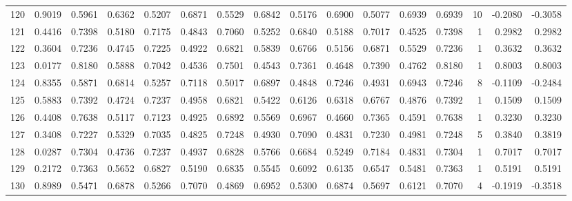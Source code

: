 \begin{tabular}{lrrrrrrrrrrrrrrr}
120 &      0.9019 &  0.5961 &  0.6362 &  0.5207 &  0.6871 &  0.5529 &  0.6842 &  0.5176 &  0.6900 &  0.5077 &   0.6939 &     0.6939 &     10 &                   -0.2080 &                    -0.3058 \\
121 &      0.4416 &  0.7398 &  0.5180 &  0.7175 &  0.4843 &  0.7060 &  0.5252 &  0.6840 &  0.5188 &  0.7017 &   0.4525 &     0.7398 &      1 &                    0.2982 &                     0.2982 \\
122 &      0.3604 &  0.7236 &  0.4745 &  0.7225 &  0.4922 &  0.6821 &  0.5839 &  0.6766 &  0.5156 &  0.6871 &   0.5529 &     0.7236 &      1 &                    0.3632 &                     0.3632 \\
123 &      0.0177 &  0.8180 &  0.5888 &  0.7042 &  0.4536 &  0.7501 &  0.4543 &  0.7361 &  0.4648 &  0.7390 &   0.4762 &     0.8180 &      1 &                    0.8003 &                     0.8003 \\
124 &      0.8355 &  0.5871 &  0.6814 &  0.5257 &  0.7118 &  0.5017 &  0.6897 &  0.4848 &  0.7246 &  0.4931 &   0.6943 &     0.7246 &      8 &                   -0.1109 &                    -0.2484 \\
125 &      0.5883 &  0.7392 &  0.4724 &  0.7237 &  0.4958 &  0.6821 &  0.5422 &  0.6126 &  0.6318 &  0.6767 &   0.4876 &     0.7392 &      1 &                    0.1509 &                     0.1509 \\
126 &      0.4408 &  0.7638 &  0.5117 &  0.7123 &  0.4925 &  0.6892 &  0.5569 &  0.6967 &  0.4660 &  0.7365 &   0.4591 &     0.7638 &      1 &                    0.3230 &                     0.3230 \\
127 &      0.3408 &  0.7227 &  0.5329 &  0.7035 &  0.4825 &  0.7248 &  0.4930 &  0.7090 &  0.4831 &  0.7230 &   0.4981 &     0.7248 &      5 &                    0.3840 &                     0.3819 \\
128 &      0.0287 &  0.7304 &  0.4736 &  0.7237 &  0.4937 &  0.6828 &  0.5766 &  0.6684 &  0.5249 &  0.7184 &   0.4831 &     0.7304 &      1 &                    0.7017 &                     0.7017 \\
129 &      0.2172 &  0.7363 &  0.5652 &  0.6827 &  0.5190 &  0.6835 &  0.5545 &  0.6092 &  0.6135 &  0.6547 &   0.5481 &     0.7363 &      1 &                    0.5191 &                     0.5191 \\
130 &      0.8989 &  0.5471 &  0.6878 &  0.5266 &  0.7070 &  0.4869 &  0.6952 &  0.5300 &  0.6874 &  0.5697 &   0.6121 &     0.7070 &      4 &                   -0.1919 &                    -0.3518 \\

\end{tabular}
